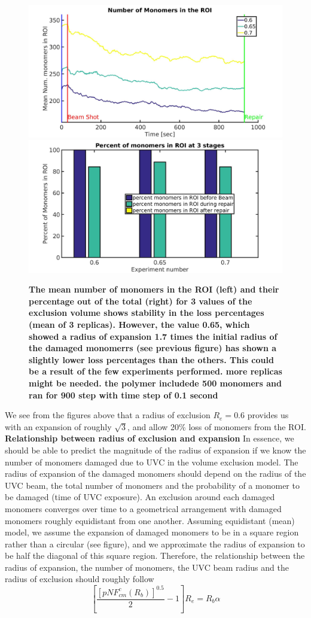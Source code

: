 \documentclass[12pt]{report}
\begin{document}
	\begin{figure}[H]
	\includegraphics[width=0.5\linewidth,height=0.3\textheight]{Images/ExludeAroundDamagedMonomers/BreakDamagedCrosslinks/06/meanNumMonomersInROI}
	\includegraphics[width=0.5\linewidth,height=0.3\textheight]{Images/ExludeAroundDamagedMonomers/BreakDamagedCrosslinks/06/percentOfMonomersInROI}
	\caption{\tiny{\textbf{The mean number of monomers in the ROI (left) and their percentage out of the total (right) for 3 values of the exclusion volume shows stability in the loss percentages (mean of 3 replicas). However, the value 0.65, which showed a radius of expansion 1.7 times the initial radius of the damaged monomerrs (see previous figure) has shown a slightly lower loss percentages than the others. This could be a result of the few experiments performed. more replicas might be needed. the polymer includede 500 monomers and ran for 900 step with time step of 0.1 second}}}
	\label{fig:meanNumMonomersInROIVolumeOfExclusionParameterFitting}
	\end{figure}
	   
   We see from the figures above that a radius of exclusion $R_e=0.6$ provides us with an expansion of roughly $\sqrt{3}$, and allow 20\% loss of monomers from the ROI. \\
         
   \textbf{\large{Relationship between radius of exclusion and expansion}}   
   In essence, we should be able to predict the magnitude of the radius of expansion if we know the number of monomers damaged due to UVC in the volume exclusion model. 
   The radius of expansion of the damaged monomers should depend on the radius of the UVC beam, the total number of monomers and the probability of a monomer to be damaged (time of UVC exposure).
   An exclusion around each damaged monomers converges over time to a geometrical arrangement with damaged monomers roughly equidistant from one another. Assuming equidistant (mean) model, we assume the expansion of damaged monomers to be in a square region rather than a circular (see figure), and we approximate the radius of expansion to be half the diagonal of this square region. Therefore, the relationship between the radius of expansion, the number of monomers, the UVC beam radius and the radius of exclusion should roughly follow
   \begin{equation*}
   \left[\frac{[pNF_{cm}^c(R_b)]^{0.5}}{2}-1 \right]R_e = R_b\alpha
   \end{equation*}
   
\end{document}
